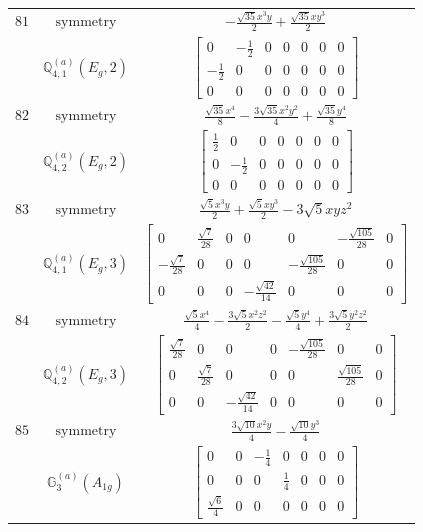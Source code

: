 \documentclass[fleqn,8pt,landscape]{jsarticle}
\begin{document}
\begin{longtable}{ccc}
$ 81 $ & $ \text{symmetry} $ & $ - \frac{\sqrt{35} x^{3} y}{2} + \frac{\sqrt{35} x y^{3}}{2} $ \\
$  $ & $ \mathbb{Q}_{4,1}^{(a)}(E_{g},2) $ & $ \begin{bmatrix} 0 & - \frac{1}{2} & 0 & 0 & 0 & 0 & 0 \\ - \frac{1}{2} & 0 & 0 & 0 & 0 & 0 & 0 \\ 0 & 0 & 0 & 0 & 0 & 0 & 0 \end{bmatrix} $ \\ \hline
$ 82 $ & $ \text{symmetry} $ & $ \frac{\sqrt{35} x^{4}}{8} - \frac{3 \sqrt{35} x^{2} y^{2}}{4} + \frac{\sqrt{35} y^{4}}{8} $ \\
$  $ & $ \mathbb{Q}_{4,2}^{(a)}(E_{g},2) $ & $ \begin{bmatrix} \frac{1}{2} & 0 & 0 & 0 & 0 & 0 & 0 \\ 0 & - \frac{1}{2} & 0 & 0 & 0 & 0 & 0 \\ 0 & 0 & 0 & 0 & 0 & 0 & 0 \end{bmatrix} $ \\ \hline
$ 83 $ & $ \text{symmetry} $ & $ \frac{\sqrt{5} x^{3} y}{2} + \frac{\sqrt{5} x y^{3}}{2} - 3 \sqrt{5} x y z^{2} $ \\
$  $ & $ \mathbb{Q}_{4,1}^{(a)}(E_{g},3) $ & $ \begin{bmatrix} 0 & \frac{\sqrt{7}}{28} & 0 & 0 & 0 & - \frac{\sqrt{105}}{28} & 0 \\ - \frac{\sqrt{7}}{28} & 0 & 0 & 0 & - \frac{\sqrt{105}}{28} & 0 & 0 \\ 0 & 0 & 0 & - \frac{\sqrt{42}}{14} & 0 & 0 & 0 \end{bmatrix} $ \\ \hline
$ 84 $ & $ \text{symmetry} $ & $ \frac{\sqrt{5} x^{4}}{4} - \frac{3 \sqrt{5} x^{2} z^{2}}{2} - \frac{\sqrt{5} y^{4}}{4} + \frac{3 \sqrt{5} y^{2} z^{2}}{2} $ \\
$  $ & $ \mathbb{Q}_{4,2}^{(a)}(E_{g},3) $ & $ \begin{bmatrix} \frac{\sqrt{7}}{28} & 0 & 0 & 0 & - \frac{\sqrt{105}}{28} & 0 & 0 \\ 0 & \frac{\sqrt{7}}{28} & 0 & 0 & 0 & \frac{\sqrt{105}}{28} & 0 \\ 0 & 0 & - \frac{\sqrt{42}}{14} & 0 & 0 & 0 & 0 \end{bmatrix} $ \\ \hline
$ 85 $ & $ \text{symmetry} $ & $ \frac{3 \sqrt{10} x^{2} y}{4} - \frac{\sqrt{10} y^{3}}{4} $ \\
$  $ & $ \mathbb{G}_{3}^{(a)}(A_{1g}) $ & $ \begin{bmatrix} 0 & 0 & - \frac{1}{4} & 0 & 0 & 0 & 0 \\ 0 & 0 & 0 & \frac{1}{4} & 0 & 0 & 0 \\ \frac{\sqrt{6}}{4} & 0 & 0 & 0 & 0 & 0 & 0 \end{bmatrix} $ \\ \hline

\end{longtable}
\end{document}
